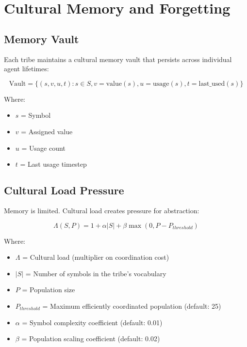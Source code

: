 \documentclass[11pt,a4paper]{article}
\begin{document}
\section{Cultural Memory and Forgetting}

\subsection{Memory Vault}

Each tribe maintains a cultural memory vault that persists across individual agent lifetimes:

\begin{equation}
\text{Vault} = \{ (s, v, u, t) : s \in S, v = \text{value}(s), u = \text{usage}(s), t = \text{last\_used}(s) \}
\end{equation}

Where:
\begin{itemize}
    \item $s$ = Symbol
    \item $v$ = Assigned value
    \item $u$ = Usage count
    \item $t$ = Last usage timestep
\end{itemize}

\subsection{Cultural Load Pressure}

Memory is limited. Cultural load creates pressure for abstraction:

\begin{equation}
\Lambda(S, P) = 1 + \alpha |S| + \beta \max(0, P - P_{threshold})
\end{equation}

Where:
\begin{itemize}
    \item $\Lambda$ = Cultural load (multiplier on coordination cost)
    \item $|S|$ = Number of symbols in the tribe's vocabulary
    \item $P$ = Population size
    \item $P_{threshold}$ = Maximum efficiently coordinated population (default: 25)
    \item $\alpha$ = Symbol complexity coefficient (default: 0.01)
    \item $\beta$ = Population scaling coefficient (default: 0.02)
\end{itemize}
\end{document}
